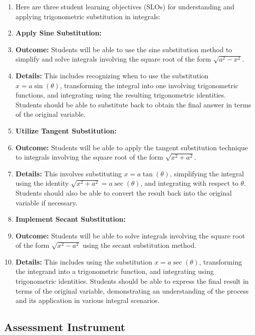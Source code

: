 \begin{enumerate}
    \item Here are three student learning objectives (SLOs) for understanding and applying trigonometric substitution in integrals:
    \item \textbf{Apply Sine Substitution:}
    \item \textbf{Outcome:} Students will be able to use the sine substitution method to simplify and solve integrals involving the square root of the form $\sqrt{a^2 - x^2}$.
    \item \textbf{Details:} This includes recognizing when to use the substitution $x = a \sin(\theta)$, transforming the integral into one involving trigonometric functions, and integrating using the resulting trigonometric identities. Students should be able to substitute back to obtain the final answer in terms of the original variable.
    \item \textbf{Utilize Tangent Substitution:}
    \item \textbf{Outcome:} Students will be able to apply the tangent substitution technique to integrals involving the square root of the form $\sqrt{x^2 + a^2}$.
    \item \textbf{Details:} This involves substituting $x = a \tan(\theta)$, simplifying the integral using the identity $\sqrt{x^2 + a^2} = a \sec(\theta)$, and integrating with respect to $\theta$. Students should also be able to convert the result back into the original variable if necessary.
    \item \textbf{Implement Secant Substitution:}
    \item \textbf{Outcome:} Students will be able to solve integrals involving the square root of the form $\sqrt{x^2 - a^2}$ using the secant substitution method.
    \item \textbf{Details:} This includes using the substitution $x = a \sec(\theta)$, transforming the integrand into a trigonometric function, and integrating using trigonometric identities. Students should be able to express the final result in terms of the original variable, demonstrating an understanding of the process and its application in various integral scenarios.
\end{enumerate}

\subsection{Assessment Instrument}
\label{ssec:trig-8a0f}

